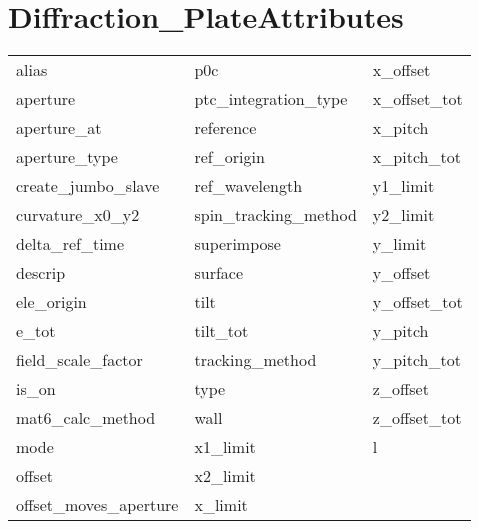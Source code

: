  \section{Diffraction_PlateAttributes}
 \label{s:list.diffraction.plate}
 
 \begin{tabular}{lll} \toprule
alias                       & p0c                         & x_offset                    \\
aperture                    & ptc_integration_type        & x_offset_tot                \\
aperture_at                 & reference                   & x_pitch                     \\
aperture_type               & ref_origin                  & x_pitch_tot                 \\
create_jumbo_slave          & ref_wavelength              & y1_limit                    \\
curvature_x0_y2             & spin_tracking_method        & y2_limit                    \\
delta_ref_time              & superimpose                 & y_limit                     \\
descrip                     & surface                     & y_offset                    \\
ele_origin                  & tilt                        & y_offset_tot                \\
e_tot                       & tilt_tot                    & y_pitch                     \\
field_scale_factor          & tracking_method             & y_pitch_tot                 \\
is_on                       & type                        & z_offset                    \\
mat6_calc_method            & wall                        & z_offset_tot                \\
mode                        & x1_limit                    & l                           \\
offset                      & x2_limit                    &                             \\
offset_moves_aperture       & x_limit                     &                             \\
 \bottomrule
 \end{tabular}
 \vfill
 
